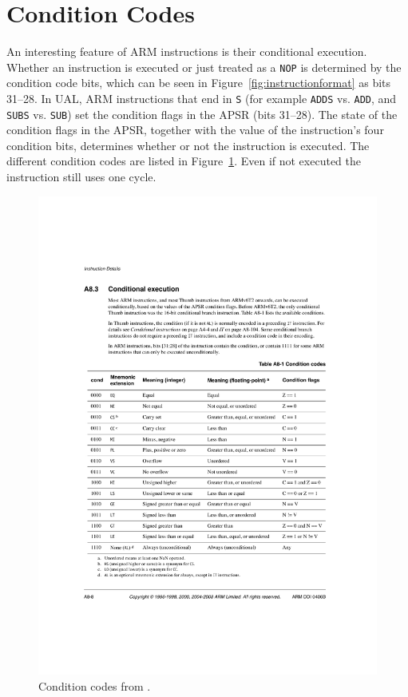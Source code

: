 \documentclass[oneside,a4paper]{report}
\begin{document}
\section{Condition Codes}\label{sec:conditioncodes}
An interesting feature of ARM instructions is their conditional execution. Whether an instruction is executed or just treated as a \texttt{NOP} is determined by the condition code bits, which can be seen in Figure~\ref{fig:instructionformat} as bits 31--28. In UAL, ARM instructions that end in \texttt{S} (for example \texttt{ADDS} vs. \texttt{ADD}, and \texttt{SUBS} vs. \texttt{SUB}) set the condition flags in the APSR (bits 31--28). The state of the condition flags in the APSR, together with the value of the instruction's four condition bits, determines whether or not the instruction is executed. The different condition codes are listed in Figure~\ref{fig:conditioncodes}. Even if not executed the instruction still uses one cycle.

\begin{figure}[htb]
	\centering
	\includegraphics[width=1.0\textwidth]{./fig/ConditionCodes.pdf}
	\caption{Condition codes from \cite[p. A8-8]{ARMRef}.}
	\label{fig:conditioncodes}
\end{figure}
\end{document}
